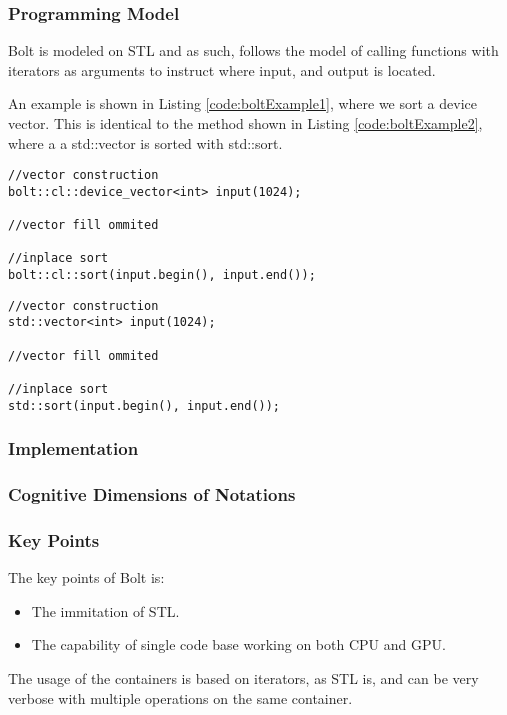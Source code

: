 \subsubsection{Programming Model}
Bolt is modeled on STL and as such, follows the model of calling functions with iterators as arguments to instruct where input, and output is located.

An example is shown in Listing \ref{code:boltExample1}, where we sort a device vector. This is identical to the method shown in Listing \ref{code:boltExample2}, where a a std::vector is sorted with std::sort.
\begin{lstlisting}[caption={Bolt sort example}, label={code:boltExample1}]
//vector construction
bolt::cl::device_vector<int> input(1024);

//vector fill ommited

//inplace sort
bolt::cl::sort(input.begin(), input.end());
\end{lstlisting}

\begin{lstlisting}[caption={STL sort example}, label={code:boltExample2}]
//vector construction
std::vector<int> input(1024);

//vector fill ommited

//inplace sort
std::sort(input.begin(), input.end());
\end{lstlisting}

\subsubsection{Implementation}

\subsubsection{Cognitive Dimensions of Notations}

\subsubsection{Key Points}
The key points of Bolt is:

\begin{itemize}
\item The immitation of STL.
\item The capability of single code base working on both CPU and GPU.
\end{itemize}

The usage of the containers is based on iterators, as STL is, and can be very verbose with multiple operations on the same container.
